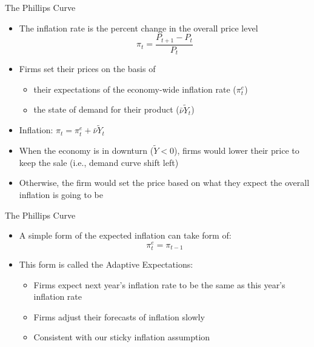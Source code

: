 \documentclass[aspectratio=1610]{beamer}
\begin{document}
\begin{frame}[wide]{The Phillips Curve}
	\begin{itemize}
		\item The inflation rate is the percent change in the overall price level
		\[\pi_t = \frac{P_{t+1}-P_t}{P_t}\]
		\item Firms set their prices on the basis of
		\begin{itemize}
			\item their expectations of the economy-wide inflation rate ($\pi^e_t$)
			\item the state of demand for their product ($\bar{\nu}\tilde{Y}_t$)
		\end{itemize}
		\item Inflation: $\pi_t = \pi_t^e + \bar{\nu}\tilde{Y}_t$
		\item When the economy is in downturn ($\tilde{Y}<0$), firms would lower their price to keep the sale (i.e., demand curve shift left)
		\item Otherwise, the firm would set the price based on what they expect the overall inflation is going to be
	\end{itemize}
\end{frame}

\begin{frame}[wide]{The Phillips Curve}
	\begin{itemize}
		\item A simple form of the expected inflation can take form of:
		\[\pi^e_t = \pi_{t-1}\]
		\vspace{4mm}
		\item This form is called the Adaptive Expectations:
		\begin{itemize}
			\item Firms expect next year’s inflation rate to be the same as this year’s inflation rate
			\item Firms adjust their forecasts of inflation slowly
			\item Consistent with our sticky inflation assumption
		\end{itemize}
	\end{itemize}
\end{frame}
\end{document}

